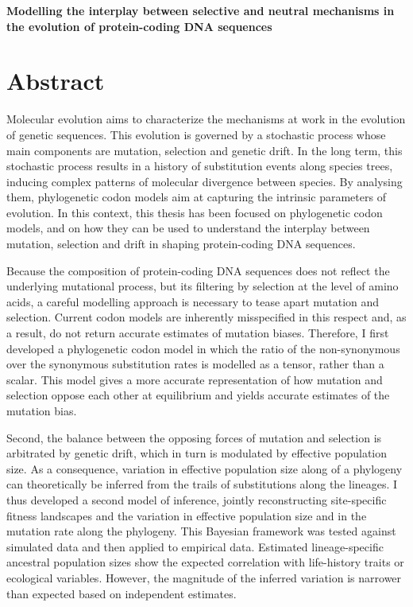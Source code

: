 \begin{center}
	\LARGE
	\textbf{Modelling the interplay between selective and neutral mechanisms in the evolution of protein-coding DNA sequences}
\end{center}

\section*{Abstract}

Molecular evolution aims to characterize the mechanisms at work in the evolution of genetic sequences.
This evolution is governed by a stochastic process whose main components are mutation, selection and genetic drift.
In the long term, this stochastic process results in a history of substitution events along species trees, inducing complex patterns of molecular divergence between species.
By analysing them, phylogenetic codon models aim at capturing the intrinsic parameters of evolution.
In this context, this thesis has been focused on phylogenetic codon models, and on how they can be used to understand the interplay between mutation, selection and drift in shaping protein-coding DNA sequences.

Because the composition of protein-coding DNA sequences does not reflect the underlying mutational process, but its filtering by selection at the level of amino acids, a careful modelling approach is necessary to tease apart mutation and selection.
Current codon models are inherently misspecified in this respect and, as a result, do not return accurate estimates of mutation biases.
Therefore, I first developed a phylogenetic codon model in which the ratio of the non-synonymous over the synonymous substitution rates is modelled as a tensor, rather than a scalar.
This model gives a more accurate representation of how mutation and selection oppose each other at equilibrium and yields accurate estimates of the mutation bias.

Second, the balance between the opposing forces of mutation and selection is arbitrated by genetic drift, which in turn is modulated by effective population size.
As a consequence, variation in effective population size along of a phylogeny can theoretically be inferred from the trails of substitutions along the lineages.
I thus developed a second model of inference, jointly reconstructing site-specific fitness landscapes and the variation in effective population size and in the mutation rate along the phylogeny.
This Bayesian framework was tested against simulated data and then applied to empirical data.
Estimated lineage-specific ancestral population sizes show the expected correlation with life-history traits or ecological variables.
However, the magnitude of the inferred variation is narrower than expected based on independent estimates.

